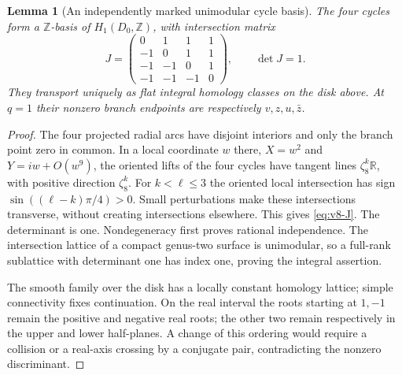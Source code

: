 \documentclass[11pt]{article}
\newtheorem{lemma}[lemma]{Lemma}
\theoremstyle{definition}
\theoremstyle{remark}
\newcommand{\R}{\mathbb R}
\newcommand{\Z}{\mathbb Z}
\begin{document}
\begin{lemma}[An independently marked unimodular cycle basis]
\label{lem:v8-star-cycles}
The four cycles form a $\Z$-basis of $H_1(D_0,\Z)$, with intersection
matrix
\begin{equation}
 J=\begin{pmatrix}
 0&1&1&1\\-1&0&1&1\\-1&-1&0&1\\-1&-1&-1&0
 \end{pmatrix},\qquad \det J=1.
 \label{eq:v8-J}
\end{equation}
They transport uniquely as flat integral homology classes on the disk above.
At $q=1$ their nonzero branch endpoints are respectively $v,z,u,\bar z$.
\end{lemma}
\begin{proof}
The four projected radial arcs have disjoint interiors and only the branch
point zero in common. In a local coordinate $w$ there, $X=w^2$ and
$Y=iw+O(w^9)$, the oriented lifts of the four cycles have tangent lines
$\zeta_8^k\R$, with positive direction $\zeta_8^k$. For $k<\ell\le3$
the oriented local intersection has sign
$\sin((\ell-k)\pi/4)>0$. Small perturbations make these intersections
transverse, without creating intersections elsewhere. This gives
\eqref{eq:v8-J}. The determinant is one. Nondegeneracy first proves
rational independence. The intersection lattice of a compact genus-two
surface is unimodular, so a full-rank sublattice with determinant one has
index one, proving the integral assertion.

The smooth family over the disk has a locally constant homology lattice;
simple connectivity fixes continuation. On the real interval the roots
starting at $1,-1$ remain the positive and negative real roots; the other
two remain respectively in the upper and lower half-planes. A change of
this ordering would require a collision or a real-axis crossing by a
conjugate pair, contradicting the nonzero discriminant.
\end{proof}
\end{document}
